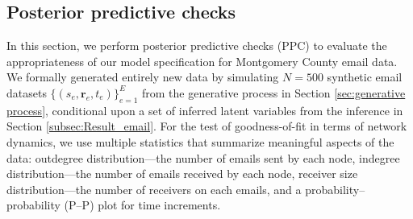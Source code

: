 \documentclass[ba]{imsart}
\def\spacingset#1{\renewcommand{\baselinestretch}%
	{#1}\small\normalsize} \spacingset{1}
\numberwithin{equation}{section}
\theoremstyle{plain}
\begin{document}
	\subsection{Posterior predictive checks}\label{subsec:PPC_email} 	   
	In this section, we perform posterior predictive checks (PPC) \citep{rubin1984bayesianly} to evaluate the appropriateness of our model specification for Montgomery County email data. We formally generated entirely new data by simulating $N=500$ synthetic email datasets $\{(s_{e}, \boldsymbol{r}_{e}, t_{e})\}_{e=1}^E$ from the generative process in Section \ref{sec:generative process}, conditional upon a set of inferred latent variables from the inference in Section \ref{subsec:Result_email}. For the test of goodness-of-fit in terms of network dynamics, we use multiple statistics that summarize meaningful aspects of the data: outdegree distribution---the number of emails sent by each node, indegree distribution---the number of emails received by each node, receiver size distribution---the number of receivers on each emails, and a probability--probability (P--P) plot for time increments. 

\end{document}

